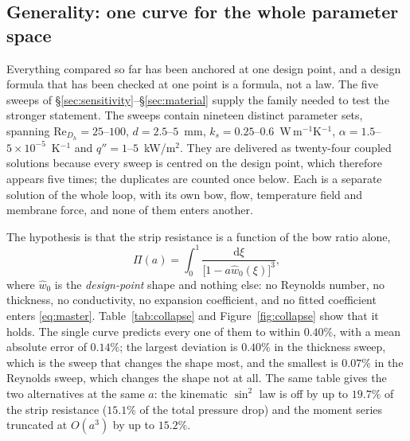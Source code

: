 \documentclass[11pt,a4paper]{article}
\newcommand{\dd}{\mathrm{d}}
\newcommand{\ReDh}{\mathrm{Re}_{D_h}}
\begin{document}
\subsection{Generality: one curve for the whole parameter space}
\label{sec:collapse}

Everything compared so far has been anchored at one design point, and a design formula that
has been checked at one point is a formula, not a law. The five sweeps of
\S\ref{sec:sensitivity}--\S\ref{sec:material} supply the family needed to test the stronger
statement. The sweeps contain nineteen distinct parameter sets, spanning $\ReDh=25$--$100$,
$d=2.5$--$5$~mm, $k_s=0.25$--$0.6$~W\,m$^{-1}$K$^{-1}$, $\alpha=1.5$--$5\times10^{-5}$~K$^{-1}$
and $q''=1$--$5$~kW/m$^2$. They are delivered as twenty-four coupled solutions because every
sweep is centred on the design point, which therefore appears five times; the duplicates are
counted once below. Each is a separate solution of the whole loop, with its own bow, flow,
temperature field and membrane force, and none of them enters another.

The hypothesis is that the strip resistance is a function of the bow ratio alone,
\begin{equation}
\Pi(a)=\int_0^1\frac{\dd\xi}{\bigl[1-a\hat w_0(\xi)\bigr]^3},
\label{eq:master}
\end{equation}
where $\hat w_0$ is the \emph{design-point} shape and nothing else: no Reynolds number, no
thickness, no conductivity, no expansion coefficient, and no fitted coefficient enters
\eqref{eq:master}. Table~\ref{tab:collapse} and Figure~\ref{fig:collapse} show that it holds.
The single curve predicts every one of them to within $0.40\%$, with a mean absolute error
of $0.14\%$; the largest deviation is $0.40\%$ in the thickness sweep, which is the sweep that
changes the shape most, and the smallest is $0.07\%$ in the Reynolds sweep, which changes the
shape not at all. The same table gives the two alternatives at the same $a$: the kinematic
$\sin^2$ law is off by up to $19.7\%$ of the strip resistance ($15.1\%$ of the total pressure
drop) and the moment series truncated at $O(a^3)$ by up to $15.2\%$.
\end{document}
